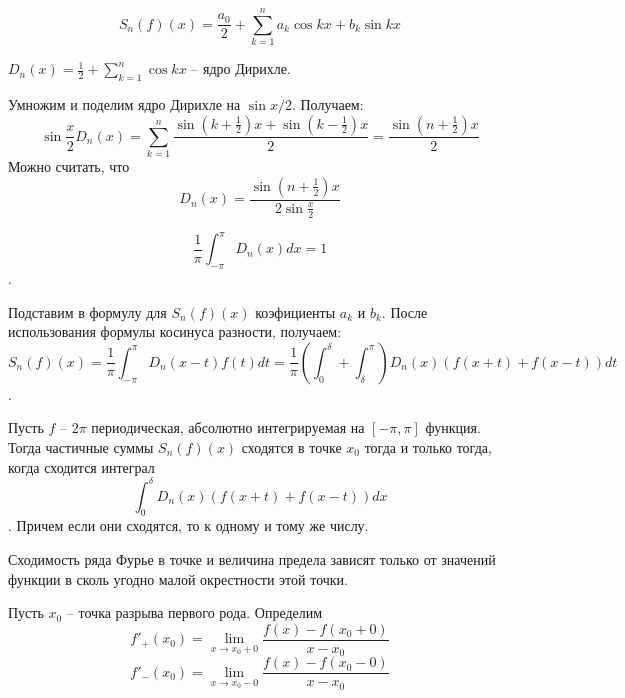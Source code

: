 \documentclass[document.tex]{subfiles}
\begin{document}
\begin{definition}
	$$S_n(f)(x) = \frac{a_0}{2} + \sum_{k = 1}^n a_k \cos kx + b_k \sin kx$$
\end{definition}

\begin{definition}
	$D_n(x) = \frac{1}{2} + \sum_{k=1}^n \cos kx$ -- ядро Дирихле.
\end{definition}

\begin{remark}
	Умножим и поделим ядро Дирихле на $\sin x/2$. Получаем:
	$$\sin \frac{x}{2} D_n(x) = \sum_{k = 1}^n \frac{\sin(k + \frac{1}{2})x + \sin (k - \frac{1}{2})x}{2} 
	= \frac{\sin(n+\frac{1}{2})x}{2}$$
	Можно считать, что $$D_n(x) = \frac{\sin(n+\frac{1}{2})x}{2 \sin \frac{x}{2}}$$
\end{remark}

\begin{remark}
	$$\frac{1}{\pi} \int_{-\pi}^{\pi} D_n(x) dx = 1$$.
\end{remark}

\begin{remark}
	Подставим в формулу для $S_n(f)(x)$ коэфициенты $a_k$ и $b_k$. После использования формулы косинуса разности, получаем:
	$$S_n(f)(x) = \frac{1}{\pi} \int_{-\pi}^{\pi} D_n(x - t) f(t) dt = 
	\frac{1}{\pi} \left(\int_0^{\delta} + \int_{\delta}^{\pi} \right) D_n(x) (f(x+t) + f(x-t))dt$$.
\end{remark}

\begin{theorem}
	Пусть $f$ -- $2\pi$ периодическая, абсолютно интегрируемая на $[-\pi, \pi]$ функция. Тогда частичные суммы $S_n(f)(x)$ сходятся в точке
	$x_0$ тогда и только тогда, когда сходится интеграл $$\int_0^{\delta} D_n(x) (f(x+t) + f(x-t))dx$$. Причем если они сходятся, то к одному
	и тому же числу.
\end{theorem}

\begin{corollary}
	Сходимость ряда Фурье в точке и величина предела зависят только от значений функции в сколь угодно малой окрестности этой точки.
\end{corollary}

\begin{definition}
	Пусть $x_0$ -- точка разрыва первого рода. Определим
	$$f'_+(x_0) = \lim_{x \rightarrow x_0+0} \frac{f(x) - f(x_0+0)}{x-x_0}$$ 
	$$f'_-(x_0) = \lim_{x \rightarrow x_0-0} \frac{f(x) - f(x_0-0)}{x-x_0}$$
\end{definition}
\end{document}
